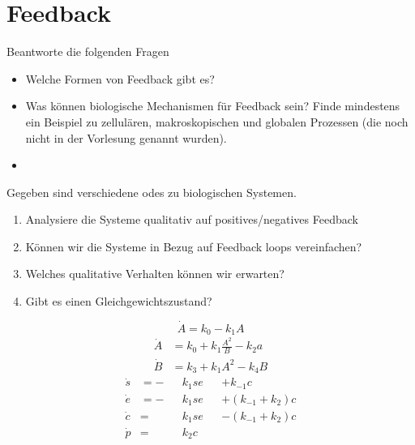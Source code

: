 \section{Feedback}
Beantworte die folgenden Fragen
\begin{itemize}
    \item Welche Formen von Feedback gibt es?
    \item Was können biologische Mechanismen für Feedback sein? Finde mindestens ein Beispiel zu zellulären, makroskopischen und globalen Prozessen (die noch nicht in der Vorlesung genannt wurden).
    \item 
\end{itemize}
%
%
Gegeben sind verschiedene \acp{ode} zu biologischen Systemen.
\begin{enumerate}
    \item Analysiere die Systeme qualitativ auf positives/negatives Feedback
    \item Können wir die Systeme in Bezug auf Feedback loops vereinfachen?
    \item Welches qualitative Verhalten können wir erwarten?
    \item Gibt es einen Gleichgewichtszustand?
\end{enumerate}
\begin{equation}
    \dot{A} = k_0 - k_1 A
\end{equation}
%
\begin{equation}
    \begin{aligned}
        \dot{A} &= k_0 + k_1 \frac{A^2}{B} - k_2a\\
        \dot{B} &= k_3 + k_1 A^2 - k_4 B
    \end{aligned}
\end{equation}
%
\begin{equation}
    \begin{aligned}
        \dot{s} &= -&&k_1se &&+ k_{-1}c\\
        \dot{e} &= -&&k_1se &&+ (k_{-1}+k_2)c\\
        \dot{c} &= &&k_1se &&- (k_{-1}+k_2)c\\
        \dot{p} &= &&k_2c
    \end{aligned}
\end{equation}
%
